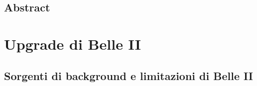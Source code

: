 \documentclass[10pt,a4paper,twoside]{report}
\begin{document}
\doublespacing
\tableofcontents
\singlespacing


\begin{comment}
\begin{frontespizio}
\Universita{Pisa}
\Logo[scale=.1]{logo}
\Dipartimento{Fisica}
\Corso{Fisica delle Interazioni Fondamentali}
\Titolo{Studio di rivelatori a pixel monolitici CMOS per l'upgrade dell'esperimento Belle II}
\Candidato{Mara Stefania Calo'}
\Relatore{prof. Francesco Forti}
\Annoaccademico{2022.2023}
\end{frontespizio}
\end{comment}

\newpage

\section*{Abstract}

\begin{comment}
Belle II è un esperimento di fisica delle particelle situato a Tsukuba, in Giappone, nel laboratorio (di) KEK (100 km da Tokyo). E' una flavor-factory di seconda generazione che opera alla frontiera dell'intensità, detenendo il record mondiale di maggiore luminosità. L'acceleratore SuperKEKB è un collider di fasci $e^{+}$ $e^{-}$ con energie asimmetriche e piccate alla risonanza $\Upsilon$(4S). Auspica a raccogliere un set di dati fino a 50 $ab^{-1}$ (x50 Belle dataset, x100 BaBar dataset) per studiare la violazione di CP nei mesoni B e ricerca nuova fisica oltre il Modello Standard.
\end{comment}







\chapter{Upgrade di Belle II}

\section{Sorgenti di background e limitazioni di Belle II}
\end{document}
